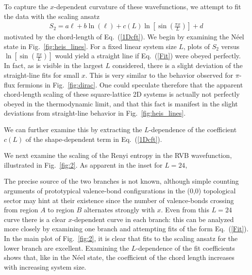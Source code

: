 \documentclass[prl,aps,twocolumn,floatfix,amsmath,amssymb,superscriptaddress,tightenlines]{revtex4}
\begin{document}
To capture the $x$-dependent curvature of these wavefunctions, we attempt to fit the data with the scaling ansatz
\begin{align}
S_2= a \ell + b\ln(\ell)
+ c(L) \ln \left[{ \sin\left({ \frac{\pi x}{L} }\right) }\right] + d \label{Fit}
\end{align}
motivated by the chord-length of Eq.~(\ref{1Dcft}).
We begin by examining the N\'eel state in Fig.~{\ref{fig:heis_lines}}.  For a fixed linear system size $L$, plots of $S_2$ versus $ \ln \left[{ \sin\left({ \frac{\pi x}{L} }\right) }\right] $ would yield a straight line if Eq.~(\ref{Fit}) were obeyed perfectly.  In fact, as is visible in the largest $L$ considered, there is a slight deviation of the straight-line fits for small $x$.  This is very similar to the behavior observed for $\pi$-flux fermions in Fig.~\ref{fig:dirac}.  One could speculate therefore that the apparent chord-length scaling of these square-lattice 2D systems is actually not perfectly obeyed in the thermodynamic limit, and that this fact is manifest in the slight deviations from straight-line behavior in Fig.~{\ref{fig:heis_lines}}.

We can further examine this by extracting the $L$-dependence of the coefficient $c(L)$ of the shape-dependent term in Eq.~(\ref{1Dcft}).


We next examine the scaling of the Renyi entropy in the RVB wavefunction, illustrated in Fig.~{\ref{fig:2}}.  As apparent in the inset for $L=24$, 


 The precise source of the two branches is not known, although simple counting arguments of prototypical valence-bond configurations in the (0,0) topological sector may hint at their existence since the number of valence-bonds crossing from region $A$ to region $B$ alternates strongly with $x$.  Even from this $L=24$ curve there is a clear $x$-dependent curve in each branch: this can be analyzed more closely by examining one branch and attempting fits of the form Eq.~(\ref{Fit}).  In the main plot of Fig.~{\ref{fig:2}}, it is clear that fits to the scaling ansatz for the lower branch are excellent.  Examining the $L$-dependence of the fit coefficients shows that, like in the N\'eel state, the coefficient of the chord length increases with increasing system size.
\end{document}
